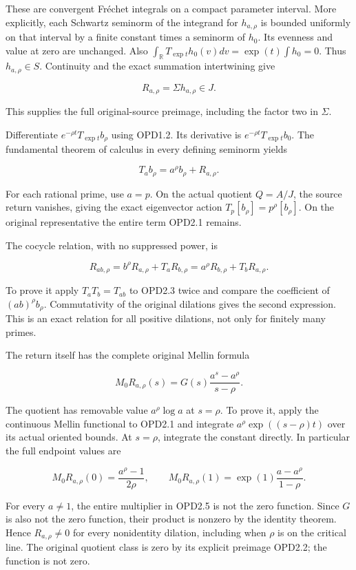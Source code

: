 These are convergent Fréchet integrals on a compact parameter interval.
More explicitly, each Schwartz seminorm of the integrand for
\(h_{a,\rho}\) is bounded uniformly on that interval by a finite
constant times a seminorm of \(h_0\). Its evenness and value at zero are
unchanged. Also
\(\int_{\mathbb R}T_{\exp t}h_0(v)dv=\exp(t)\int h_0=0\). Thus
\(h_{a,\rho}\in S\). Continuity and the exact summation intertwining
give

\[
R_{a,\rho}=\Sigma h_{a,\rho}\in J.
\tag{OPD2.2}
\]

This supplies the full original-source preimage, including the factor
two in \(\Sigma\).

Differentiate \(e^{-\rho t}T_{\exp t}b_\rho\) using OPD1.2. Its
derivative is \(e^{-\rho t}T_{\exp t}b_0\). The fundamental theorem of
calculus in every defining seminorm yields

\[
\boxed{T_ab_\rho=a^\rho b_\rho+R_{a,\rho}.}
\tag{OPD2.3}
\]

For each rational prime, use \(a=p\). On the actual quotient \(Q=A/J\),
the source return vanishes, giving the exact eigenvector action
\(T_p[b_\rho]=p^\rho[b_\rho]\). On the original representative the
entire term OPD2.1 remains.

The cocycle relation, with no suppressed power, is

\[
R_{ab,\rho}=b^\rho R_{a,\rho}+T_aR_{b,\rho}
=a^\rho R_{b,\rho}+T_bR_{a,\rho}.
\tag{OPD2.4}
\]

To prove it apply \(T_aT_b=T_{ab}\) to OPD2.3 twice and compare the
coefficient of \((ab)^\rho b_\rho\). Commutativity of the original
dilations gives the second expression. This is an exact relation for all
positive dilations, not only for finitely many primes.

The return itself has the complete original Mellin formula

\[
M_0R_{a,\rho}(s)=G(s)\frac{a^s-a^\rho}{s-\rho}.
\tag{OPD2.5}
\]

The quotient has removable value \(a^\rho\log a\) at \(s=\rho\). To
prove it, apply the continuous Mellin functional to OPD2.1 and integrate
\(a^\rho\exp((s-\rho)t)\) over its actual oriented bounds. At
\(s=\rho\), integrate the constant directly. In particular the full
endpoint values are

\[
M_0R_{a,\rho}(0)=\frac{a^\rho-1}{2\rho},\qquad
M_0R_{a,\rho}(1)=\exp(1)\frac{a-a^\rho}{1-\rho}.
\tag{OPD2.6}
\]

For every \(a\ne1\), the entire multiplier in OPD2.5 is not the zero
function. Since \(G\) is also not the zero function, their product is
nonzero by the identity theorem. Hence \(R_{a,\rho}\ne0\) for every
nonidentity dilation, including when \(\rho\) is on the critical line.
The original quotient class is zero by its explicit preimage OPD2.2; the
function is not zero.

